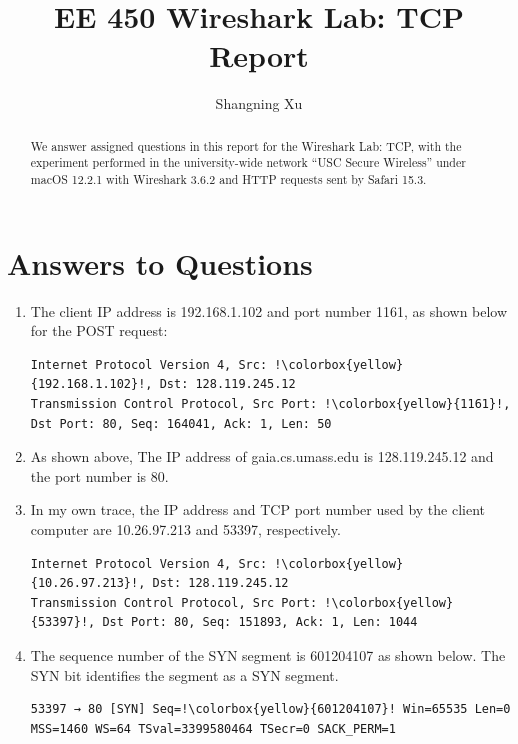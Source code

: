 \documentclass{article}
\title{EE 450 Wireshark Lab: TCP Report}
\author{Shangning Xu}
\begin{document}
\maketitle
\newpage

\begin{abstract}
    We answer assigned questions in this report for the Wireshark Lab: TCP, with the experiment performed in the university-wide network ``USC Secure Wireless'' under macOS 12.2.1 with Wireshark 3.6.2 and HTTP requests sent by Safari 15.3.
\end{abstract}

\section{Answers to Questions}

\begin{enumerate}
    \item The client IP address is 192.168.1.102 and port number 1161, as shown below for the POST request:
\begin{verbatim}
Internet Protocol Version 4, Src: !\colorbox{yellow}{192.168.1.102}!, Dst: 128.119.245.12
Transmission Control Protocol, Src Port: !\colorbox{yellow}{1161}!, Dst Port: 80, Seq: 164041, Ack: 1, Len: 50
\end{verbatim}

    \item As shown above, The IP address of gaia.cs.umass.edu is 128.119.245.12 and the port number is 80.
    
    \item In my own trace, the IP address and TCP port number used by the client computer are 10.26.97.213 and 53397, respectively.
\begin{verbatim}
Internet Protocol Version 4, Src: !\colorbox{yellow}{10.26.97.213}!, Dst: 128.119.245.12
Transmission Control Protocol, Src Port: !\colorbox{yellow}{53397}!, Dst Port: 80, Seq: 151893, Ack: 1, Len: 1044
\end{verbatim}
    
    \item The sequence number of the SYN segment is 601204107 as shown below. The SYN bit identifies the segment as a SYN segment.
\begin{verbatim}
53397 → 80 [SYN] Seq=!\colorbox{yellow}{601204107}! Win=65535 Len=0 MSS=1460 WS=64 TSval=3399580464 TSecr=0 SACK_PERM=1
\end{verbatim}


\end{enumerate}
\end{document}
